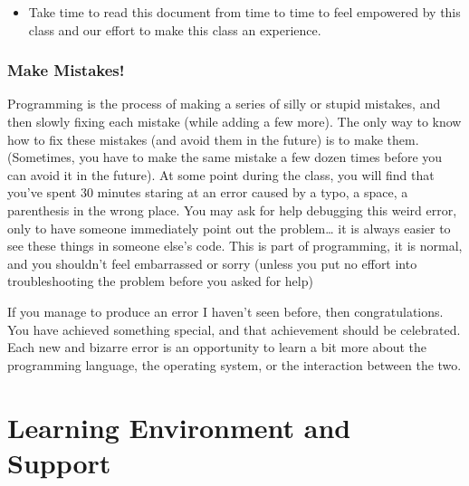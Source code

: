 \documentclass[
  11pt,
  letterpaper,
  DIV=11,
  numbers=noendperiod]{scrartcl}
\providecommand{\tightlist}{%
  \setlength{\itemsep}{0pt}\setlength{\parskip}{0pt}}\usepackage{longtable,booktabs,array}
\begin{document}
\begin{tcolorbox}[enhanced jigsaw, toptitle=1mm, arc=.35mm, toprule=.15mm, colback=white, opacityback=0, coltitle=black, colbacktitle=quarto-callout-tip-color!10!white, colframe=quarto-callout-tip-color-frame, bottomtitle=1mm, opacitybacktitle=0.6, leftrule=.75mm, title=\textcolor{quarto-callout-tip-color}{\faLightbulb}\hspace{0.5em}{Sign Contract}, left=2mm, bottomrule=.15mm, breakable, titlerule=0mm, rightrule=.15mm]

\begin{itemize}
\tightlist
\item
  Take time to read this document from time to time to feel empowered by
  this class and our effort to make this class an experience.
\end{itemize}

\end{tcolorbox}

\hypertarget{make-mistakes}{%
\subsubsection{Make Mistakes!}\label{make-mistakes}}

Programming is the process of making a series of silly or stupid
mistakes, and then slowly fixing each mistake (while adding a few more).
The only way to know how to fix these mistakes (and avoid them in the
future) is to make them. (Sometimes, you have to make the same mistake a
few dozen times before you can avoid it in the future). At some point
during the class, you will find that you've spent 30 minutes staring at
an error caused by a typo, a space, a parenthesis in the wrong place.
You may ask for help debugging this weird error, only to have someone
immediately point out the problem\ldots{} it is always easier to see
these things in someone else's code. This is part of programming, it is
normal, and you shouldn't feel embarrassed or sorry (unless you put no
effort into troubleshooting the problem before you asked for help)

If you manage to produce an error I haven't seen before, then
congratulations. You have achieved something special, and that
achievement should be celebrated. Each new and bizarre error is an
opportunity to learn a bit more about the programming language, the
operating system, or the interaction between the two.

\hypertarget{learning-environment-and-support}{%
\section{Learning Environment and
Support}\label{learning-environment-and-support}}
\end{document}
